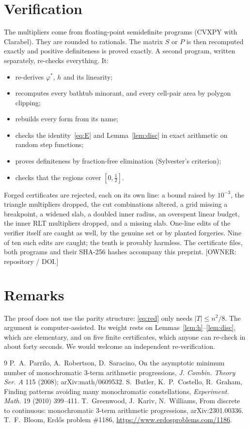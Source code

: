 \documentclass[11pt]{article}
\newcommand{\vphi}{\varphi}
\begin{document}
\section{Verification}
The multipliers come from floating-point semidefinite programs (CVXPY with Clarabel).
They are rounded to rationals. The matrix $S$ or $P$ is then recomputed exactly and
positive definiteness is proved exactly. A second program, written separately, re-checks
everything. It:
\begin{itemize}
\item re-derives $\vphi^*$, $h$ and its linearity;
\item recomputes every bathtub minorant, and every cell-pair area by polygon clipping;
\item rebuilds every form from its name;
\item checks the identity~\eqref{eq:E} and Lemma~\ref{lem:disc} in exact arithmetic on random step functions;
\item proves definiteness by fraction-free elimination (Sylvester's criterion);
\item checks that the regions cover $[0,\frac12]$.
\end{itemize}
Forged certificates are rejected, each on its own line: a bound raised by $10^{-3}$, the triangle
multipliers dropped, the cut combinations altered, a grid missing a breakpoint, a widened slab, a
doubled inner radius, an overspent linear budget, the inner RLT multipliers dropped, and a missing
slab. One-line edits of the verifier itself are caught as well, by the genuine set or by planted
forgeries. Nine of ten such edits are caught; the tenth is provably harmless.
The certificate files, both programs and their SHA-256 hashes accompany this preprint.
[OWNER: repository / DOI.]

\section{Remarks}
The proof does not use the parity structure: \eqref{eq:red} only needs $|T|\le n^2/8$.
The argument is computer-assisted. Its weight rests on Lemmas~\ref{lem:h}--\ref{lem:disc},
which are elementary, and on five finite certificates, which anyone can re-check in about
forty seconds. We would welcome an independent re-verification.

\begin{thebibliography}{9}
 P.~A.~Parrilo, A.~Robertson, D.~Saracino, On the asymptotic minimum number of
monochromatic 3-term arithmetic progressions, \emph{J. Combin. Theory Ser. A} 115 (2008); arXiv:math/0609532.
 S.~Butler, K.~P.~Costello, R.~Graham, Finding patterns avoiding many monochromatic
constellations, \emph{Experiment. Math.} 19 (2010) 399--411.
 T.~Greenwood, J.~Kariv, N.~Williams, From discrete to continuous: monochromatic
3-term arithmetic progressions, arXiv:2301.00336.
 T.~F.~Bloom, Erd\H{o}s problem \#1186, \url{https://www.erdosproblems.com/1186}.
\end{thebibliography}
\end{document}
